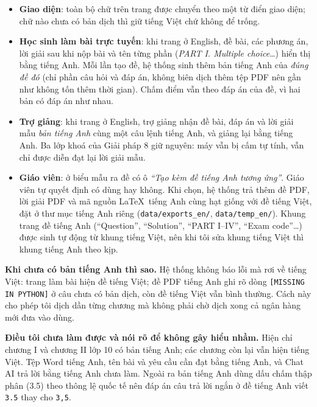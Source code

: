 \begin{itemize}[leftmargin=1.2cm, itemsep=2pt]
  \item \textbf{Giao diện}: toàn bộ chữ trên trang được chuyển theo một từ điển
        giao diện; chữ nào chưa có bản dịch thì giữ tiếng Việt chứ không để
        trống.
  \item \textbf{Học sinh làm bài trực tuyến}: khi trang ở English, đề bài, các
        phương án, lời giải sau khi nộp bài và tên từng phần (\textit{PART I.
        Multiple choice}\dots) hiển thị bằng tiếng Anh. Mỗi lần tạo đề, hệ
        thống sinh thêm bản tiếng Anh của \textit{đúng đề đó} (chỉ phần câu hỏi
        và đáp án, không biên dịch thêm tệp PDF nên gần như không tốn thêm thời
        gian). Chấm điểm vẫn theo đáp án của đề, vì hai bản có đáp án như nhau.
  \item \textbf{Trợ giảng}: khi trang ở English, trợ giảng nhận đề bài, đáp án và
        lời giải mẫu \textit{bản tiếng Anh} cùng một câu lệnh tiếng Anh, và giảng
        lại bằng tiếng Anh. Ba lớp khoá của Giải pháp 8 giữ nguyên: máy vẫn bị
        cấm tự tính, vẫn chỉ được diễn đạt lại lời giải mẫu.
  \item \textbf{Giáo viên}: ở biểu mẫu ra đề có ô \textit{``Tạo kèm đề tiếng Anh
        tương ứng''}. Giáo viên tự quyết định có dùng hay không. Khi chọn, hệ
        thống trả thêm đề PDF, lời giải PDF và mã nguồn \LaTeX\ tiếng Anh cùng
        hạt giống với đề tiếng Việt, đặt ở thư mục tiếng Anh riêng
        (\texttt{data/exports\_en/}, \texttt{data/temp\_en/}). Khung trang đề
        tiếng Anh (``Question'', ``Solution'', ``PART I--IV'', ``Exam code''\dots)
        được sinh tự động từ khung tiếng Việt, nên khi tôi sửa khung tiếng Việt
        thì khung tiếng Anh theo kịp.
\end{itemize}

\textbf{Khi chưa có bản tiếng Anh thì sao.} Hệ thống không báo lỗi mà rơi về tiếng
Việt: trang làm bài hiện đề tiếng Việt; đề PDF tiếng Anh ghi rõ dòng
\texttt{[MISSING IN PYTHON]} ở câu chưa có bản dịch, còn đề tiếng Việt vẫn bình
thường. Cách này cho phép tôi dịch dần từng chương mà không phải chờ dịch xong
cả ngân hàng mới đưa vào dùng.

\textbf{Điều tôi chưa làm được và nói rõ để không gây hiểu nhầm.} Hiện chỉ chương I
và chương II lớp 10 có bản tiếng Anh; các chương còn lại vẫn hiện tiếng Việt.
Tệp Word tiếng Anh, tên bài và yêu cầu cần đạt bằng tiếng Anh, và Chat AI trả lời
bằng tiếng Anh chưa làm. Ngoài ra bản tiếng Anh dùng dấu chấm thập phân (3.5)
theo thông lệ quốc tế nên đáp án câu trả lời ngắn ở đề tiếng Anh viết \texttt{3.5}
thay cho \texttt{3,5}.


